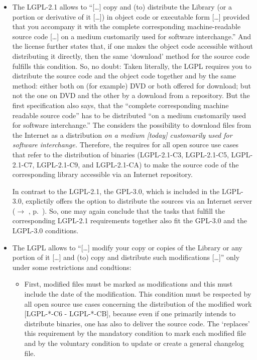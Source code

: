 \begin{itemize}
\item The LGPL-2.1 allows to \enquote{[\ldots] copy and (to) distribute the
  Library (or a portion or derivative of it [\ldots]) in object code or
  executable form [\ldots] provided that you accompany it with the complete
  corresponding machine-readable source code [\ldots] on a medium customarily
  used for software interchange.} And the license further states that, if one
  makes the object code accessible without distributing it directly, then the
  same `download' method for the source code fulfills this
  condition.  So, no doubt: Taken literally, the LGPL requires
  you to distribute the source code and the object code together and by the same
  method: either both on (for example) DVD or both offered for download; but not
  the one on DVD and the other by a download from a repository. But the first
  specification also says, that the \enquote{complete corresponding machine
  readable source code} has to be distributed \enquote{on a medium customarily
  used for software interchange.}  The \oslic{} considers the
  possibility to download files from the Internet as a distribution \emph{on a
  medium [today] customarily used for software interchange.} Therefore, the
  \oslic{} requires for all open source use cases that refer to the distribution
  of binaries (LGPL-2.1-C3, LGPL-2.1-C5, LGPL-2.1-C7, LGPL-2.1-C9, and
  LGPL-2.1-CA) to make the source code of the corresponding library accessible
  via an Internet repository.
  
  In contrast to the LGPL-2.1, the GPL-3.0, which is included in the LGPL-3.0,
  explictily offers the option to distribute the sources via an Internet server
  ($\rightarrow$ \oslic, p.\ \pageref{Gpl3CondCopyleft}). So, one may again
  conclude that the tasks that fulfill the corresponding LGPL-2.1 requirements
  together also fit the GPL-3.0 and the LGPL-3.0 conditions. 
  
\item The LGPL allows to \enquote{[\ldots] modify your copy or copies of the
  Library or any portion of it [\ldots] and (to) copy and distribute such
  modifications [\ldots]} only under some restrictions and
  condtions: 
  \begin{itemize}
  \item First, modified files must be marked as modifications and this must
    include the date of the modification. This
    condition must be respected by all open source use cases concerning the
    distribution of the modified work [LGPL-*-C6 - LGPL-*-CB], because even if
    one primarily intends to distribute binaries, one has also to deliver the
    source code. The \oslic{} `replaces' this requirement by the mandatory
    condition to mark each modified file and by the voluntary condition to
    update or create a general changelog file.
    

\end{itemize}
\end{itemize}
